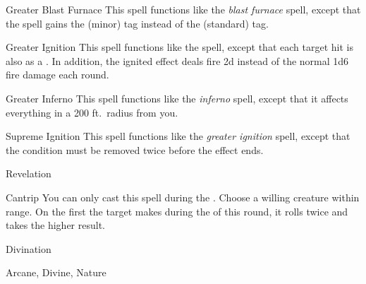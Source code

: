 \lowercase{\hypertarget{spell:Greater Blast Furnace}{}}\label{spell:Greater Blast Furnace}
\begin{ability}[\nth{4}]{\hypertarget{spell:Greater Blast Furnace}{Greater Blast Furnace}}
This spell functions like the \textit{blast furnace} spell, except that the spell gains the  (minor) tag instead of the  (standard) tag.
\end{ability}
\vspace{0.25em}



\lowercase{\hypertarget{spell:Greater Ignition}{}}\label{spell:Greater Ignition}
\begin{ability}[\nth{4}]{\hypertarget{spell:Greater Ignition}{Greater Ignition}}
This spell functions like the  spell, except that each target hit is also  as a .
In addition, the ignited effect deals fire  \minus2d instead of the normal 1d6 fire damage each round.
\end{ability}
\vspace{0.25em}



\lowercase{\hypertarget{spell:Greater Inferno}{}}\label{spell:Greater Inferno}
\begin{ability}[\nth{5}]{\hypertarget{spell:Greater Inferno}{Greater Inferno}}
This spell functions like the \textit{inferno} spell, except that it affects everything in a 200 ft.\ radius from you.
\end{ability}
\vspace{0.25em}



\lowercase{\hypertarget{spell:Supreme Ignition}{}}\label{spell:Supreme Ignition}
\begin{ability}[\nth{6}]{\hypertarget{spell:Supreme Ignition}{Supreme Ignition}}
This spell functions like the \textit{greater ignition} spell, except that the condition must be removed twice before the effect ends.
\end{ability}
\vspace{0.25em}


\newpage
\begin{spellsection}{Revelation}

\begin{spellheader}
\end{spellheader}


\begin{ability}{Cantrip}
You can only cast this spell during the .
Choose a willing creature within \rngclose range.
On the first  the target makes during the  of this round, it rolls twice and takes the higher result.
\end{ability}




 Divination

 Arcane, Divine, Nature
\end{spellsection}


